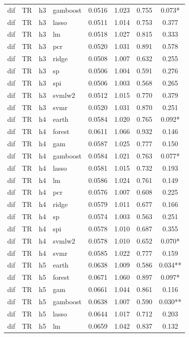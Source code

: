 \begin{ThreePartTable}
\begin{longtable}[t]{llclcccc}
dif & TR & h3 & gamboost & 0.0516 & 1.023 & 0.755 & 0.073*\\
dif & TR & h3 & lasso & 0.0511 & 1.014 & 0.753 & 0.377\\
dif & TR & h3 & lm & 0.0518 & 1.027 & 0.815 & 0.333\\
dif & TR & h3 & pcr & 0.0520 & 1.031 & 0.891 & 0.578\\
dif & TR & h3 & ridge & 0.0508 & 1.007 & 0.632 & 0.255\\
dif & TR & h3 & sp & 0.0506 & 1.004 & 0.591 & 0.276\\
dif & TR & h3 & spi & 0.0506 & 1.003 & 0.568 & 0.265\\
dif & TR & h3 & svmlw2 & 0.0512 & 1.015 & 0.770 & 0.379\\
dif & TR & h3 & svmr & 0.0520 & 1.031 & 0.870 & 0.251\\
\addlinespace
dif & TR & h4 & earth & 0.0584 & 1.020 & 0.765 & 0.092*\\
dif & TR & h4 & forest & 0.0611 & 1.066 & 0.932 & 0.146\\
dif & TR & h4 & gam & 0.0587 & 1.025 & 0.777 & 0.150\\
dif & TR & h4 & gamboost & 0.0584 & 1.021 & 0.763 & 0.077*\\
dif & TR & h4 & lasso & 0.0581 & 1.015 & 0.732 & 0.193\\
dif & TR & h4 & lm & 0.0586 & 1.024 & 0.761 & 0.149\\
dif & TR & h4 & pcr & 0.0576 & 1.007 & 0.608 & 0.225\\
dif & TR & h4 & ridge & 0.0579 & 1.011 & 0.677 & 0.166\\
dif & TR & h4 & sp & 0.0574 & 1.003 & 0.563 & 0.251\\
dif & TR & h4 & spi & 0.0578 & 1.010 & 0.687 & 0.355\\
dif & TR & h4 & svmlw2 & 0.0578 & 1.010 & 0.652 & 0.070*\\
dif & TR & h4 & svmr & 0.0585 & 1.022 & 0.777 & 0.159\\
\addlinespace
dif & TR & h5 & earth & 0.0638 & 1.009 & 0.586 & 0.034**\\
dif & TR & h5 & forest & 0.0671 & 1.060 & 0.897 & 0.097*\\
dif & TR & h5 & gam & 0.0661 & 1.044 & 0.861 & 0.116\\
dif & TR & h5 & gamboost & 0.0638 & 1.007 & 0.590 & 0.030**\\
dif & TR & h5 & lasso & 0.0644 & 1.017 & 0.712 & 0.203\\
dif & TR & h5 & lm & 0.0659 & 1.042 & 0.837 & 0.132\\

\end{longtable}
\end{ThreePartTable}

